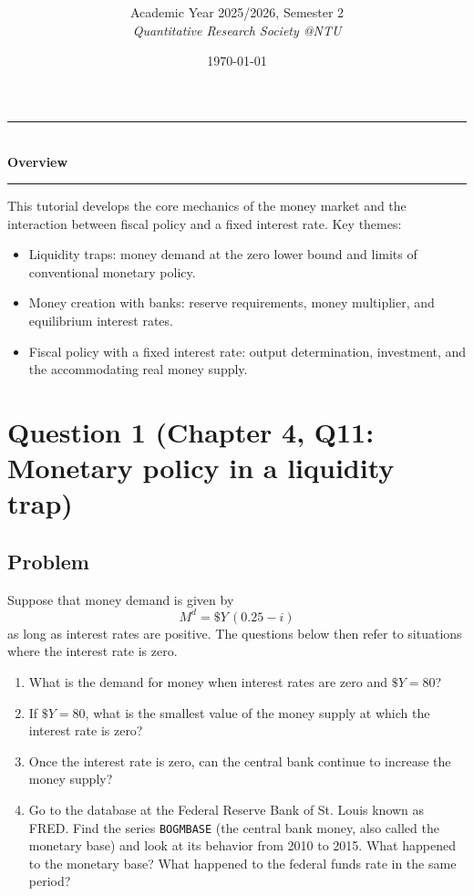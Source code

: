 \documentclass[12pt]{article}
\title{
\CourseCode \CourseName \\[0.3em]
\large \DocType
}
\author{
  Academic Year 2025/2026, Semester 2 \\[0.25em]
  \textit{Quantitative Research Society @NTU}
}
\date{\today}
\begin{document}
\maketitle
\thispagestyle{plainfirst}
\pagestyle{main}
\bigskip

\begin{center}
  \rule{0.8\textwidth}{0.4pt}\\[4pt]
  \textbf{Overview}\\[2pt]
  \rule{0.8\textwidth}{0.4pt}
\end{center}

\noindent
This tutorial develops the core mechanics of the money market and the interaction between fiscal policy and a fixed interest rate. Key themes:
\begin{itemize}[leftmargin=*]
  \item Liquidity traps: money demand at the zero lower bound and limits of conventional monetary policy.
  \item Money creation with banks: reserve requirements, money multiplier, and equilibrium interest rates.
  \item Fiscal policy with a fixed interest rate: output determination, investment, and the accommodating real money supply.
\end{itemize}

\newpage

\section*{Question 1 (Chapter 4, Q11: Monetary policy in a liquidity trap)}
\subsection*{Problem}
Suppose that money demand is given by
\[
M^d = \$Y\,(0.25-i)
\]
as long as interest rates are positive. The questions below then refer to situations where the interest rate is zero.
\begin{enumerate}[label=(\alph*)]
  \item What is the demand for money when interest rates are zero and \(\$Y=80\)?
  \item If \(\$Y=80\), what is the smallest value of the money supply at which the interest rate is zero?
  \item Once the interest rate is zero, can the central bank continue to increase the money supply?
  \item Go to the database at the Federal Reserve Bank of St. Louis known as FRED. Find the series \texttt{BOGMBASE} (the central bank money, also called the monetary base) and look at its behavior from 2010 to 2015. What happened to the monetary base? What happened to the federal funds rate in the same period?
\end{enumerate}
\end{document}
